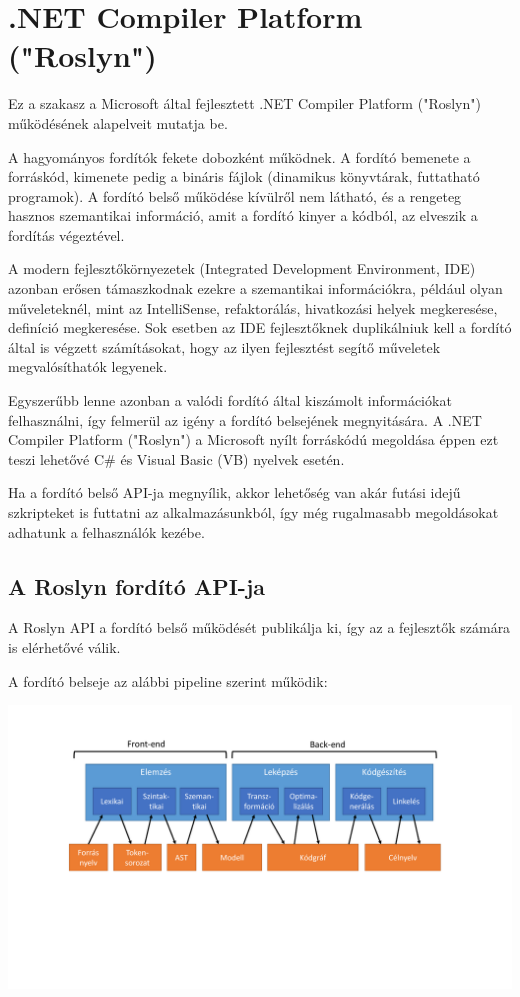 \documentclass[12pt, a4paper]{report}
\begin{document}
\section{.NET Compiler Platform ("Roslyn")}\label{RoslynAPI}

Ez a szakasz a Microsoft által fejlesztett .NET Compiler Platform ("Roslyn") \cite{Roslyn} működésének alapelveit mutatja be.

A hagyományos fordítók fekete dobozként működnek. A fordító bemenete a forráskód, kimenete pedig a bináris fájlok (dinamikus könyvtárak, futtatható programok). A fordító belső működése kívülről nem látható, és a rengeteg hasznos szemantikai információ, amit a fordító kinyer a kódból, az elveszik a fordítás végeztével.

A modern fejlesztőkörnyezetek (Integrated Development Environment, IDE) azonban erősen támaszkodnak ezekre a szemantikai információkra, például olyan műveleteknél, mint az IntelliSense, refaktorálás, hivatkozási helyek megkeresése, definíció megkeresése. Sok esetben az IDE fejlesztőknek duplikálniuk kell a fordító által is végzett számításokat, hogy az ilyen fejlesztést segítő műveletek megvalósíthatók legyenek.

Egyszerűbb lenne azonban a valódi fordító által kiszámolt információkat felhasználni, így felmerül az igény a fordító belsejének megnyitására. A .NET Compiler Platform ("Roslyn") a Microsoft nyílt forráskódú megoldása éppen ezt teszi lehetővé C\# és Visual Basic (VB) nyelvek esetén.

Ha a fordító belső API-ja megnyílik, akkor lehetőség van akár futási idejű szkripteket is futtatni az alkalmazásunkból, így még rugalmasabb megoldásokat adhatunk a felhasználók kezébe.


\subsection{A Roslyn fordító API-ja}

A Roslyn API a fordító belső működését publikálja ki, így az a fejlesztők számára is elérhetővé válik.

A fordító belseje az alábbi pipeline szerint működik:

\begin{center}\includegraphics[trim=120 100 160 360,clip,width=\textwidth,page=3]{Images.pdf}\end{center}
\end{document}
